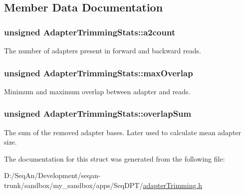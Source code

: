 \subsection{Member Data Documentation}
\hypertarget{struct_adapter_trimming_stats_aabec417e43e59c829ab9172399c2961f}{
\subsubsection[{a2count}]{\setlength{\rightskip}{0pt plus 5cm}unsigned Adapter\-Trimming\-Stats\-::a2count}}\label{struct_adapter_trimming_stats_aabec417e43e59c829ab9172399c2961f}
The number of adapters present in forward and backward reads. \hypertarget{struct_adapter_trimming_stats_a3a8e65c4bb3dbd65a51289d07699ad11}{
\subsubsection[{max\-Overlap}]{\setlength{\rightskip}{0pt plus 5cm}unsigned Adapter\-Trimming\-Stats\-::max\-Overlap}}\label{struct_adapter_trimming_stats_a3a8e65c4bb3dbd65a51289d07699ad11}
Minimum and maximum overlap between adapter and reads. \hypertarget{struct_adapter_trimming_stats_a1a223cef64dde7c1a3eb5f7a8da182b5}{
\subsubsection[{overlap\-Sum}]{\setlength{\rightskip}{0pt plus 5cm}unsigned Adapter\-Trimming\-Stats\-::overlap\-Sum}}\label{struct_adapter_trimming_stats_a1a223cef64dde7c1a3eb5f7a8da182b5}
The sum of the removed adapter bases. Later used to calculate mean adapter size. 

The documentation for this struct was generated from the following file\-:\begin{DoxyCompactItemize}
\item 
D\-:/\-Seq\-An/\-Development/seqan-\/trunk/sandbox/my\-\_\-sandbox/apps/\-Seq\-D\-P\-T/\hyperlink{adapter_trimming_8h}{adapter\-Trimming.\-h}\end{DoxyCompactItemize}
